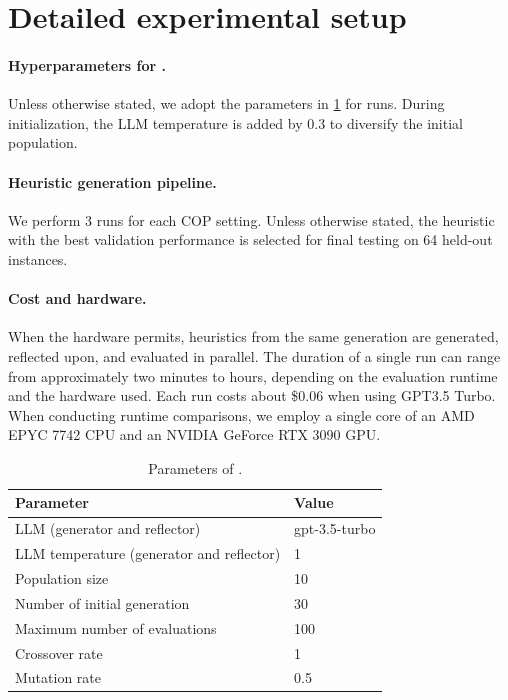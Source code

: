 \section{Detailed experimental setup}\label{app: problem settings}

\paragraph*{Hyperparameters for \our{}. }Unless otherwise stated, we adopt the parameters in \cref{tab: reevo-params} for \our{} runs. During initialization, the LLM temperature is added by 0.3 to diversify the initial population.

\paragraph*{Heuristic generation pipeline. }
We perform 3 \our{} runs for each COP setting. Unless otherwise stated, the heuristic with the best validation performance is selected for final testing on 64 held-out instances.

\paragraph*{Cost and hardware. }
When the hardware permits, heuristics from the same generation are generated, reflected upon, and evaluated in parallel. The duration of a single \our{} run can range from approximately two minutes to hours, depending on the evaluation runtime and the hardware used. Each run costs about \$0.06 when using GPT3.5 Turbo. When conducting runtime comparisons, we employ a single core of an AMD EPYC 7742 CPU and an NVIDIA GeForce RTX 3090 GPU.

\begin{table}[h]
    \small
    \caption{Parameters of \our{}.}
    \begin{tabular}{l|l}
    \toprule
    Parameter & Value \\ \midrule
    LLM (generator and reflector)& gpt-3.5-turbo \\
    LLM temperature (generator and reflector) & 1 \\
    Population size & 10 \\
    Number of initial generation & 30 \\
    Maximum number of evaluations & 100 \\
    Crossover rate & 1 \\
    Mutation rate & 0.5 \\
    \bottomrule
    \end{tabular}
    \label{tab: reevo-params}
\end{table}


